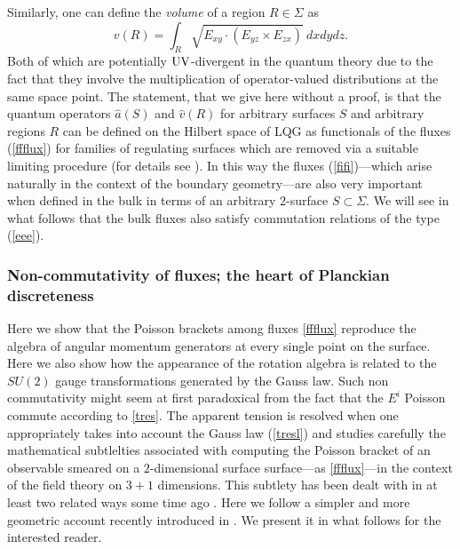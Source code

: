 \documentclass[aps, nofootinbib,superscriptaddress,12pt]{revtex4-2}
\def\be{\begin{equation}}
\def\ee{\end{equation}}
\begin{document}
Similarly, one can define the {\em volume} of a region $R \in \Sigma$ as 
\be\label{volume}
v(R)=\int_R \sqrt{E_{xy}\cdot(E_{yz}\times E_{zx})} \ dxdydz. 
\ee
Both of which are potentially $\rm UV$-divergent in the quantum theory due to the fact that they involve the multiplication of operator-valued distributions at the same space point. The statement, that we give here without a proof, is that the quantum operators $\widehat a(S)$ and $\widehat v(R)$ for arbitrary surfaces $S$ and arbitrary regions $R$ can be defined on the Hilbert space of LQG as functionals of the fluxes (\ref{ffflux}) for families of regulating surfaces which are removed via a suitable limiting procedure (for details see \cite{Ashtekar:1996eg, Ashtekar:1997fb}). In this way the fluxes (\ref{fifi})---which arise naturally in the context of the boundary geometry---are also very important when defined in the bulk 
in terms of  an arbitrary $2$-surface $S\subset \Sigma$. We will see in what follows that the bulk fluxes also satisfy 
commutation relations of the type (\ref{eee}).     

\subsubsection{ Non-commutativity of fluxes; the heart of Planckian discreteness}\label{cattaneo} 

Here we show that the Poisson brackets among fluxes \eqref{ffflux} reproduce the algebra of angular momentum generators at every single point on the surface.  Here we also show how the appearance of the rotation algebra is related to the $SU(2)$ gauge transformations generated by the Gauss law. Such non commutativity might seem at first paradoxical from the fact that the $E^i$ Poisson commute according to \eqref{tres}.
The apparent tension is resolved when one appropriately takes into account the Gauss law (\ref{tresl}) and studies carefully the mathematical subtlelties associated with computing the Poisson bracket of an observable smeared on a $2$-dimensional surface surface---as \eqref{ffflux}---in the context of the field theory on $3+1$ dimensions. This subtlety has been dealt with in at least two related ways some time ago \cite{Ashtekar:1998ak, Freidel:2011ue}. Here we follow a simpler and more geometric account recently introduced in  \cite{Cattaneo:2016zsq}. 
We present it in what follows for the interested reader.
\end{document}
